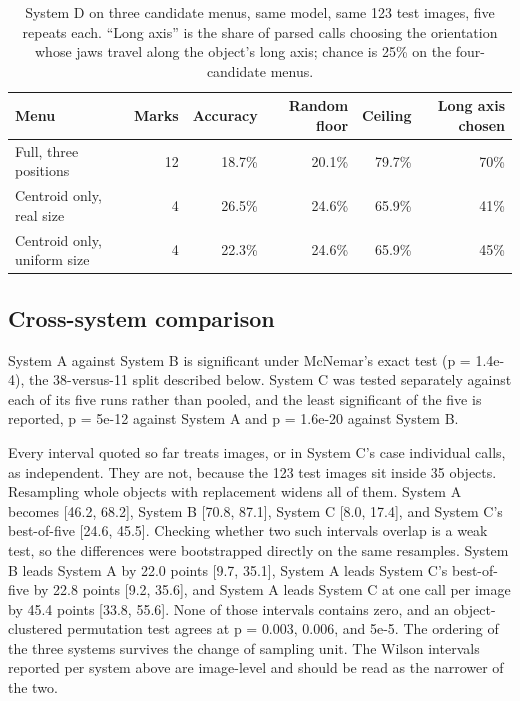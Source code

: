 \documentclass[12pt,letterpaper]{article}
\begin{document}
\begin{table}[H]
\centering
\caption{System D on three candidate menus, same model, same 123 test
images, five repeats each. ``Long axis'' is the share of parsed calls
choosing the orientation whose jaws travel along the object's long
axis; chance is 25\% on the four-candidate menus.}
\label{tab:menus}
\begin{tabular}{lrrrrr}
\toprule
Menu & Marks & Accuracy & Random floor & Ceiling & Long axis chosen \\
\midrule
Full, three positions          & 12 & 18.7\% & 20.1\% & 79.7\% & 70\% \\
Centroid only, real size       &  4 & 26.5\% & 24.6\% & 65.9\% & 41\% \\
Centroid only, uniform size    &  4 & 22.3\% & 24.6\% & 65.9\% & 45\% \\
\bottomrule
\end{tabular}
\end{table}

\subsection{Cross-system comparison}

System A against System B is significant under McNemar's exact test
(p = 1.4e-4), the 38-versus-11 split described below. System C was
tested separately against each of its five runs rather than pooled, and
the least significant of the five is reported, p = 5e-12 against System
A and p = 1.6e-20 against System B.

Every interval quoted so far treats images, or in System C's case
individual calls, as independent. They are not, because the 123 test
images sit inside 35 objects. Resampling whole objects with replacement
widens all of them. System A becomes [46.2, 68.2], System B
[70.8, 87.1], System C [8.0, 17.4], and System C's best-of-five
[24.6, 45.5]. Checking whether two such intervals overlap is a weak
test, so the differences were bootstrapped directly on the same
resamples. System B leads System A by 22.0 points [9.7, 35.1], System A
leads System C's best-of-five by 22.8 points [9.2, 35.6], and System A
leads System C at one call per image by 45.4 points [33.8, 55.6]. None
of those intervals contains zero, and an object-clustered permutation
test agrees at p = 0.003, 0.006, and 5e-5. The ordering of the three
systems survives the change of sampling unit. The Wilson intervals
reported per system above are image-level and should be read as the
narrower of the two.
\end{document}
